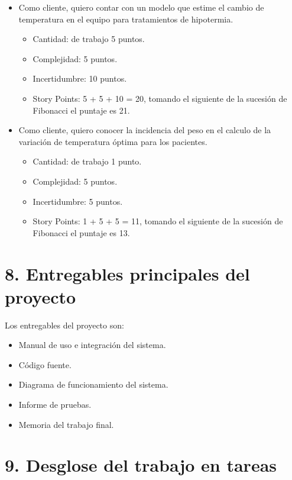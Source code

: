 \documentclass[
11pt, %
]{charter}
\begin{document}
\begin{itemize}
	\item Como cliente, quiero contar con un modelo que estime el cambio de temperatura en el equipo para tratamientos de hipotermia.
	\begin{itemize}
		\item Cantidad: de trabajo 5 puntos.
		\item Complejidad: 5 puntos.
		\item Incertidumbre: 10 puntos.
		\item Story Points: 5 + 5 + 10 = 20, tomando el siguiente de la sucesión de Fibonacci el puntaje es 21.
	\end{itemize}
	\item Como cliente, quiero conocer la incidencia del peso en el calculo de la variación de temperatura óptima para los pacientes.
		\begin{itemize}
			\item Cantidad: de trabajo 1 punto.
			\item Complejidad: 5 puntos.
			\item Incertidumbre: 5 puntos.
			\item Story Points: 1 + 5 + 5 = 11, tomando el siguiente de la sucesión de Fibonacci el puntaje es 13.
		\end{itemize}
\end{itemize}

\section{8. Entregables principales del proyecto}
\label{sec:entregables}

Los entregables del proyecto son:

\begin{itemize}
	\item Manual de uso e integración del sistema.
	\item Código fuente.
	\item Diagrama de funcionamiento del sistema.
	\item Informe de pruebas.
	\item Memoria del trabajo final.
\end{itemize}

\section{9. Desglose del trabajo en tareas}
\label{sec:wbs}
\end{document}
